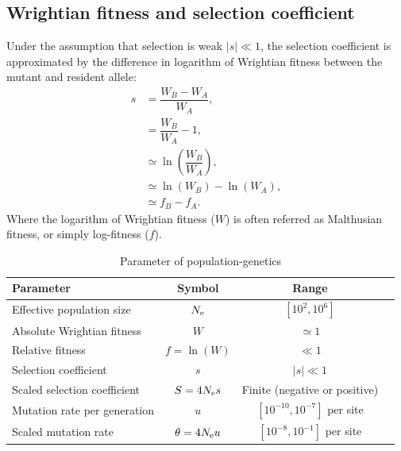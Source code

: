 \subsection{Wrightian fitness and selection coefficient}

Under the assumption that selection is weak $|s| \ll 1$, the selection coefficient is approximated by the difference in logarithm of Wrightian fitness between the mutant and resident \gls{allele}:
\begin{align}
s & = \dfrac{W_{B} - W_{A}}{W_{A}}, \\
& = \dfrac{W_{B}}{W_{A}} - 1, \\
& \simeq \ln\left( \dfrac{W_{B}}{W_{A}} \right), \\
& \simeq \ln(W_{B}) - \ln(W_{A}), \\
& \simeq f_{B} - f_{A}.
\end{align}
Where the logarithm of Wrightian fitness ($W$) is often referred as Malthusian fitness, or simply log-fitness ($f$).

\begin{table}[H]
	\centering
	\begin{tabular}{|l|c|c|c|}
		\hline
		\textbf{Parameter} & \textbf{Symbol} & \textbf{Range} \\
		\hline \hline
		Effective population size & $N_{\textrm{e}}$ & $ [10^2, 10^6]$ \\
		\hline Absolute Wrightian fitness & $W$ & $ \simeq 1 $ \\
		\hline Relative fitness & $f=\ln(W)$ & $ \ll 1 $ \\
		\hline Selection coefficient & $s$ & $ |s| \ll 1 $ \\
		\hline Scaled selection coefficient & $S=4 N_{\textrm{e}} s$ & Finite (negative or positive) \\
		\hline Mutation rate per generation & $u$ & $[10^{-10}, 10^{-7}]$ per site \\
		\hline Scaled mutation rate & $\theta = 4 N_{\textrm{e}} u$ & $[10^{-8}, 10^{-1}]$ per site \\
		\hline
	\end{tabular}
	\caption[Parameter of population-genetics]{Parameter of population-genetics}\label{table:params-popgen}
\end{table}


